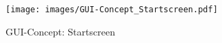 \begin{figure}[h]
\begin{minipage}{.5\textwidth}
  \label{fig:test2}
\end{minipage}
\end{figure}

\begin{figure}[h]
\centering
\texttt{[image: images/GUI-Concept\_Startscreen.pdf]}
\caption{GUI-Concept: Startscreen}
\end{figure}


